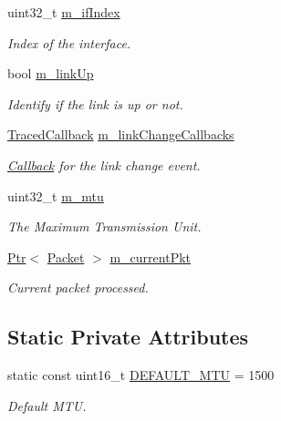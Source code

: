 \begin{DoxyCompactItemize}
uint32\+\_\+t \hyperlink{classns3_1_1PointToPointNetDevice_afc76a589eff37b6c4d72a857fe043f4c}{m\+\_\+if\+Index}
\begin{DoxyCompactList}\small\item\em Index of the interface. \end{DoxyCompactList}\item 
bool \hyperlink{classns3_1_1PointToPointNetDevice_a879bb70a26867e21d063301af8f2f22a}{m\+\_\+link\+Up}
\begin{DoxyCompactList}\small\item\em Identify if the link is up or not. \end{DoxyCompactList}\item 
\hyperlink{classns3_1_1TracedCallback}{Traced\+Callback} \hyperlink{classns3_1_1PointToPointNetDevice_a1da9efae73bde76f5a09dff8e4752e0b}{m\+\_\+link\+Change\+Callbacks}
\begin{DoxyCompactList}\small\item\em \hyperlink{classns3_1_1Callback}{Callback} for the link change event. \end{DoxyCompactList}\item 
uint32\+\_\+t \hyperlink{classns3_1_1PointToPointNetDevice_ae13b9dafe4a3bba937f53135df4f68ce}{m\+\_\+mtu}
\begin{DoxyCompactList}\small\item\em The Maximum Transmission Unit. \end{DoxyCompactList}\item 
\hyperlink{classns3_1_1Ptr}{Ptr}$<$ \hyperlink{classns3_1_1Packet}{Packet} $>$ \hyperlink{classns3_1_1PointToPointNetDevice_abfddd3ae8f730f2f81360d926d40a78b}{m\+\_\+current\+Pkt}
\begin{DoxyCompactList}\small\item\em Current packet processed. \end{DoxyCompactList}\end{DoxyCompactItemize}
\subsection*{Static Private Attributes}
\begin{DoxyCompactItemize}
\item 
static const uint16\+\_\+t \hyperlink{classns3_1_1PointToPointNetDevice_a053e12ea8d9014b856c64bd086a43f21}{D\+E\+F\+A\+U\+L\+T\+\_\+\+M\+TU} = 1500
\begin{DoxyCompactList}\small\item\em Default M\+TU. \end{DoxyCompactList}\end{DoxyCompactItemize}
